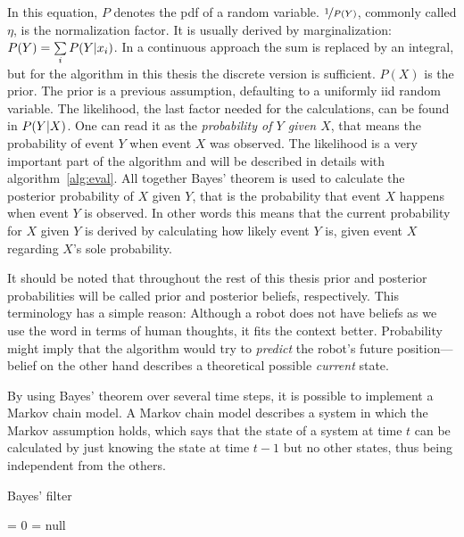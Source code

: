 \documentclass[Thesis.tex]{subfiles}
\begin{document}
In this equation, $P$ denotes the \gls{pdf} of a random variable. $\nicefrac{1}{P(Y)}$, commonly called $\eta$, is the normalization factor. It is usually derived by marginalization: $P(Y) = \sum\limits_i \p[P]{Y}{x_i}$. In a continuous approach the sum is replaced by an integral, but for the algorithm in this thesis the discrete version is sufficient. $P(X)$ is the prior. The prior is a previous assumption, defaulting to a uniformly \gls{iid} random variable. The likelihood, the last factor needed for the calculations, can be found in $\p[P]{Y}{X}$. One can read it as the \emph{probability of $Y$ given $X$}, that means the probability of event $Y$ when event $X$ was observed. 
The likelihood is a very important part of the algorithm and will be described in details with algorithm~\ref{alg:eval}. All together Bayes' theorem is used to calculate the posterior probability of $X$ given $Y$, that is the probability that event $X$ happens when event $Y$ is observed. In other words this means that the current probability for $X$ given $Y$ is derived by calculating how likely event $Y$ is, given event $X$ regarding $X$'s sole probability. 

It should be noted that throughout the rest of this thesis prior and posterior probabilities will be called prior and posterior beliefs, respectively. This terminology has a simple reason: Although a robot does not have beliefs as we use the word in terms of human thoughts, it fits the context better. Probability might imply that the algorithm would try to \emph{predict} the robot's future position---belief on the other hand describes a theoretical possible \emph{current} state.

\bigskip

By using Bayes' theorem over several time steps, it is possible to implement a Markov chain model. A Markov chain model describes a system in which the Markov assumption holds, which says that the state of a system at time $t$ can be calculated by just knowing the state at time $t-1$ but no other states, thus being independent from the others.

\begin{algorithm}
\caption{Bayes' filter}
\label{alg:bayesfilter}

\bayesfilter{} {
  \belief = 0\;
  \guess = null\;
}
\end{algorithm}
\end{document}
